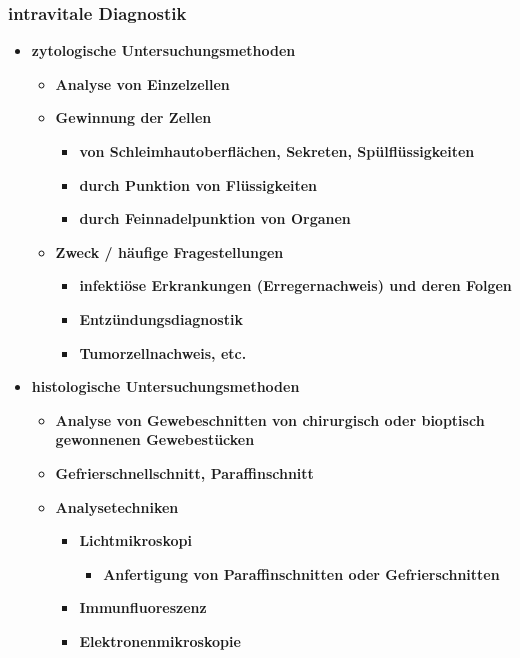 \subsubsection{intravitale Diagnostik}
	\begin{itemize}
		\item \textbf{zytologische Untersuchungsmethoden}
			\begin{itemize}
				\item \textbf{Analyse von Einzelzellen}
				\item \textbf{Gewinnung der Zellen}
					\begin{itemize}
						\item \textbf{von Schleimhautoberflächen, Sekreten, Spülflüssigkeiten}
						\item \textbf{durch Punktion von Flüssigkeiten}
						\item \textbf{durch Feinnadelpunktion von Organen}
					\end{itemize}
				\item \textbf{Zweck / häufige Fragestellungen}
					\begin{itemize}
						\item \textbf{infektiöse Erkrankungen (Erregernachweis) und deren Folgen}
						\item \textbf{Entzündungsdiagnostik}
						\item \textbf{Tumorzellnachweis, etc.}
					\end{itemize}
			\end{itemize}
		\item \textbf{histologische Untersuchungsmethoden}
			\begin{itemize}
				\item \textbf{Analyse von Gewebeschnitten von chirurgisch oder bioptisch gewonnenen Gewebestücken}
				\item \textbf{Gefrierschnellschnitt, Paraffinschnitt}
				\item \textbf{Analysetechniken}
					\begin{itemize}
						\item \textbf{Lichtmikroskopi}
							\begin{itemize}
								\item \textbf{Anfertigung von Paraffinschnitten oder Gefrierschnitten}
							\end{itemize}
						\item \textbf{Immunfluoreszenz}
						\item \textbf{Elektronenmikroskopie}
					\end{itemize}

\end{itemize}
\end{itemize}
